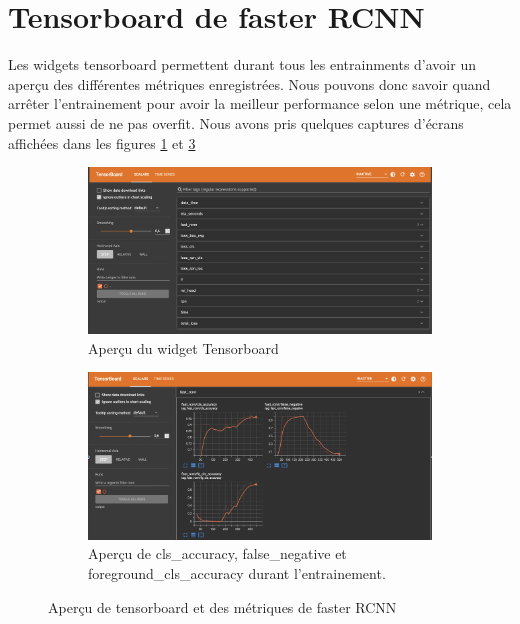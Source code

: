 \section{Tensorboard de faster RCNN }\label{anal:train_rcnn}
Les widgets tensorboard permettent durant tous les entrainments d'avoir un aperçu des différentes métriques enregistrées. Nous pouvons donc savoir quand arrêter l'entrainement pour avoir la meilleur performance selon une métrique, cela permet aussi de ne pas overfit. Nous avons pris quelques captures d'écrans affichées dans les figures \ref{fig:tensorboard_overview} et \ref{fig:tensorboard_metric}
\begin{figure}[h!]
    \centering
    \begin{subfigure}[t]{0.49\textwidth}
        \centering
        \includegraphics[width=\textwidth]{images/tensorboard_large.png}
        \caption{Aperçu du widget Tensorboard}
        \label{fig:tensorboard_overview}
    \end{subfigure}
    \begin{subfigure}[t]{0.49\textwidth}
        \centering
        \includegraphics[width=\textwidth]{images/tensorboard_metric.png}
        \caption{Aperçu de cls\_accuracy, false\_negative et foreground\_cls\_accuracy durant l'entrainement.}
        \label{fig:tensorboard_metric}
    \end{subfigure}
    \caption{Aperçu de tensorboard et des métriques de faster RCNN}
\end{figure}

